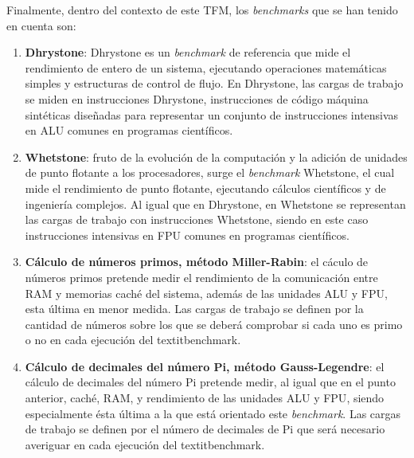 Finalmente, dentro del contexto de este \ac{TFM}, los \textit{benchmarks} que se han tenido en cuenta son:

\begin{enumerate}
  \item \textbf{Dhrystone}: Dhrystone es un \textit{benchmark} de referencia que mide el rendimiento de entero de un sistema, ejecutando operaciones matemáticas simples y estructuras de control de flujo. En Dhrystone, las cargas de trabajo se miden en instrucciones Dhrystone, instrucciones de código máquina sintéticas diseñadas para representar un conjunto de instrucciones intensivas en ALU comunes en programas científicos.
  
  \item \textbf{Whetstone}: fruto de la evolución de la computación y la adición de unidades de punto flotante a los procesadores, surge el \textit{benchmark} Whetstone, el cual mide el rendimiento de punto flotante, ejecutando cálculos científicos y de ingeniería complejos. Al igual que en Dhrystone, en Whetstone se representan las cargas de trabajo con instrucciones Whetstone, siendo en este caso instrucciones intensivas en FPU comunes en programas científicos.
  
  \item \textbf{Cálculo de números primos, método Miller-Rabin}: el cáculo de números primos pretende medir el rendimiento de la comunicación entre RAM y memorias caché del sistema, además de las unidades \ac{ALU} y \ac{FPU}, esta última en menor medida. Las cargas de trabajo se definen por la cantidad de números sobre los que se deberá comprobar si cada uno es primo o no en cada ejecución del textit{benchmark}.
  
  \item \textbf{Cálculo de decimales del número Pi, método Gauss-Legendre}: el cálculo de decimales del número Pi pretende medir, al igual que en el punto anterior, caché, RAM, y rendimiento de las unidades \ac{ALU} y \ac{FPU}, siendo especialmente ésta última a la que está orientado este \textit{benchmark}. Las cargas de trabajo se definen por el número de decimales de Pi que será necesario averiguar en cada ejecución del textit{benchmark}.
\end{enumerate}
